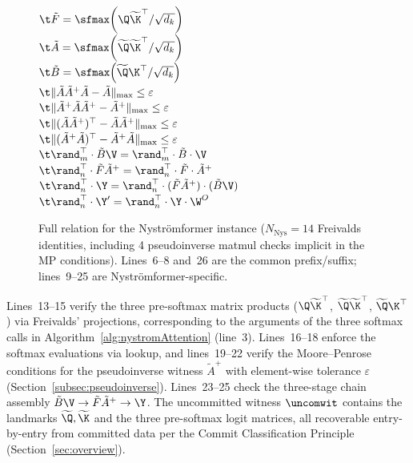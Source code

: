 \begin{figure}[!t]
{{        $\t \tilde{F} = \sfmax\!\left( \Q\widetilde{\K}^\top / \sqrt{d_k} \right)$ \\
        $\t \tilde{A} = \sfmax\!\left( \widetilde{\Q}\widetilde{\K}^\top / \sqrt{d_k} \right)$ \\
        $\t \tilde{B} = \sfmax\!\left( \widetilde{\Q}\K^\top / \sqrt{d_k} \right)$ \\
        $\t \lVert \tilde{A} \tilde{A}^+ \tilde{A} - \tilde{A} \rVert_{\max} \leq \varepsilon$ \\
        $\t \lVert \tilde{A}^+ \tilde{A} \tilde{A}^+ - \tilde{A}^+ \rVert_{\max} \leq \varepsilon$ \\
        $\t \lVert (\tilde{A} \tilde{A}^+)^\top - \tilde{A}\tilde{A}^+ \rVert_{\max} \leq \varepsilon$ \\
        $\t \lVert (\tilde{A}^+\tilde{A})^\top - \tilde{A}^+\tilde{A} \rVert_{\max} \leq \varepsilon$ \\
        $\t \rand_m^\top \cdot \tilde{B}\V = \rand_m^\top \cdot \tilde{B} \cdot \V$ \\
        $\t \rand_n^\top \cdot \tilde{F}\tilde{A}^{+} = \rand_n^\top \cdot \tilde{F} \cdot \tilde{A}^+$ \\
        $\t \rand_n^\top \cdot \Y = \rand_n^\top \cdot (\tilde{F}\tilde{A}^{+}) \cdot (\tilde{B}\V)$ \\
        $\t \rand_n^\top \cdot \Y' = \rand_n^\top \cdot \Y \cdot \W^O$
}}
\caption{Full relation for the Nystr\"{o}mformer instance ($N_{\text{Nys}}{=}14$ Freivalds identities, including 4 pseudoinverse matmul checks implicit in the MP conditions). Lines~6--8 and~26 are the common prefix/suffix; lines~9--25 are Nystr\"{o}mformer-specific.}
\label{fig:relation-nystrom}
\end{figure}

Lines~13--15 verify the three pre-softmax matrix products ($\Q\widetilde{\K}^{\top}$, $\widetilde{\Q}\widetilde{\K}^{\top}$, $\widetilde{\Q}\K^{\top}$) via Freivalds' projections, corresponding to the arguments of the three softmax calls in Algorithm~\ref{alg:nystromAttention} (line~3). Lines~16--18 enforce the softmax evaluations via lookup, and lines~19--22 verify the Moore--Penrose conditions for the pseudoinverse witness $\tilde{A}^{+}$ with element-wise tolerance $\varepsilon$ (Section~\ref{subsec:pseudoinverse}). Lines~23--25 check the three-stage chain assembly $\tilde{B}\V \to \tilde{F}\tilde{A}^{+} \to \Y$. The uncommitted witness $\uncomwit$ contains the landmarks $\widetilde{\Q}, \widetilde{\K}$ and the three pre-softmax logit matrices, all recoverable entry-by-entry from committed data per the Commit Classification Principle (Section~\ref{sec:overview}).

